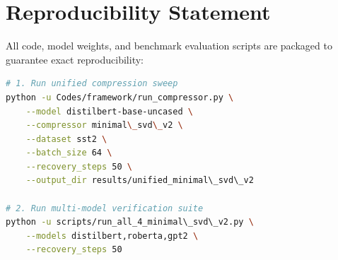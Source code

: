 \section{Reproducibility Statement}
All code, model weights, and benchmark evaluation scripts are packaged to guarantee exact reproducibility:
\begin{lstlisting}[language=bash]
# 1. Run unified compression sweep
python -u Codes/framework/run_compressor.py \
    --model distilbert-base-uncased \
    --compressor minimal\_svd\_v2 \
    --dataset sst2 \
    --batch_size 64 \
    --recovery_steps 50 \
    --output_dir results/unified_minimal\_svd\_v2

# 2. Run multi-model verification suite
python -u scripts/run_all_4_minimal\_svd\_v2.py \
    --models distilbert,roberta,gpt2 \
    --recovery_steps 50
\end{lstlisting}
